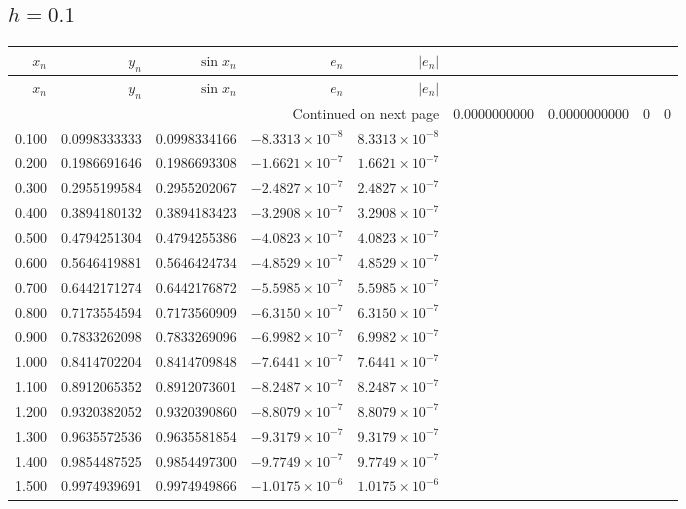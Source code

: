 \documentclass[11pt,a4paper]{article}
\begin{document}
\subsection{\texorpdfstring{$h=0.1$}{h=0.1}}
\begingroup\footnotesize\setlength{\tabcolsep}{5pt}
\begin{longtable}{rrrrr}
\toprule $x_n$ & $y_n$ & $\sin x_n$ & $e_n$ & $|e_n|$ \\ \midrule
\endfirsthead
\toprule $x_n$ & $y_n$ & $\sin x_n$ & $e_n$ & $|e_n|$ \\ \midrule
\endhead\midrule\multicolumn{5}{r}{Continued on next page}\endfoot\bottomrule\endlastfoot
0.000 & 0.0000000000 & 0.0000000000 & $0$ & $0$ \\
0.100 & 0.0998333333 & 0.0998334166 & $-8.3313\times 10^{-8}$ & $8.3313\times 10^{-8}$ \\
0.200 & 0.1986691646 & 0.1986693308 & $-1.6621\times 10^{-7}$ & $1.6621\times 10^{-7}$ \\
0.300 & 0.2955199584 & 0.2955202067 & $-2.4827\times 10^{-7}$ & $2.4827\times 10^{-7}$ \\
0.400 & 0.3894180132 & 0.3894183423 & $-3.2908\times 10^{-7}$ & $3.2908\times 10^{-7}$ \\
0.500 & 0.4794251304 & 0.4794255386 & $-4.0823\times 10^{-7}$ & $4.0823\times 10^{-7}$ \\
0.600 & 0.5646419881 & 0.5646424734 & $-4.8529\times 10^{-7}$ & $4.8529\times 10^{-7}$ \\
0.700 & 0.6442171274 & 0.6442176872 & $-5.5985\times 10^{-7}$ & $5.5985\times 10^{-7}$ \\
0.800 & 0.7173554594 & 0.7173560909 & $-6.3150\times 10^{-7}$ & $6.3150\times 10^{-7}$ \\
0.900 & 0.7833262098 & 0.7833269096 & $-6.9982\times 10^{-7}$ & $6.9982\times 10^{-7}$ \\
1.000 & 0.8414702204 & 0.8414709848 & $-7.6441\times 10^{-7}$ & $7.6441\times 10^{-7}$ \\
1.100 & 0.8912065352 & 0.8912073601 & $-8.2487\times 10^{-7}$ & $8.2487\times 10^{-7}$ \\
1.200 & 0.9320382052 & 0.9320390860 & $-8.8079\times 10^{-7}$ & $8.8079\times 10^{-7}$ \\
1.300 & 0.9635572536 & 0.9635581854 & $-9.3179\times 10^{-7}$ & $9.3179\times 10^{-7}$ \\
1.400 & 0.9854487525 & 0.9854497300 & $-9.7749\times 10^{-7}$ & $9.7749\times 10^{-7}$ \\
1.500 & 0.9974939691 & 0.9974949866 & $-1.0175\times 10^{-6}$ & $1.0175\times 10^{-6}$ \\

\end{longtable}
\end{document}
